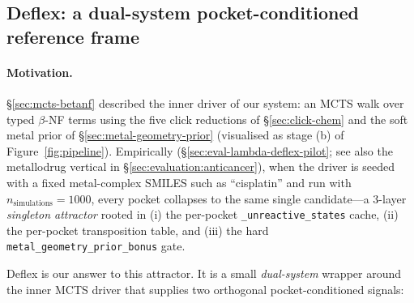 %
%

\subsection{Deflex: a dual-system pocket-conditioned reference frame}
\label{sec:deflex}

\paragraph{Motivation.}
\S\ref{sec:mcts-betanf} described the inner driver of our system: an MCTS walk over
typed $\beta$-NF terms using the five click reductions of
\S\ref{sec:click-chem} and the soft metal prior of
\S\ref{sec:metal-geometry-prior} (visualised as stage (b) of
Figure~\ref{fig:pipeline}).  Empirically
(\S\ref{sec:eval-lambda-deflex-pilot}; see also the metallodrug
vertical in \S\ref{sec:evaluation:anticancer}), when the
driver is seeded with a fixed metal-complex SMILES such as
``cisplatin'' and run with $n_{\text{simulations}}=1000$, every
pocket collapses to the same single candidate---a 3-layer
\emph{singleton attractor} rooted in (i) the per-pocket
\texttt{\_unreactive\_states} cache, (ii) the per-pocket
transposition table, and (iii) the hard
\texttt{metal\_geometry\_prior\_bonus} gate.

Deflex is our answer to this attractor.  It is a small
\emph{dual-system} wrapper around the inner MCTS driver that supplies
two orthogonal pocket-conditioned signals:

